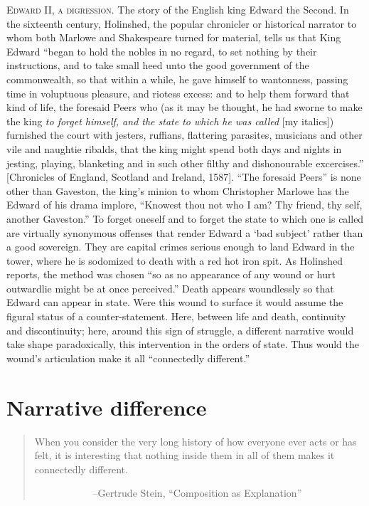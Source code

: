 \documentclass[
]{memoir}
\begin{document}
\textsc{Edward II, a digression.} The story of the English king Edward
the Second. In the sixteenth century, Holinshed, the popular chronicler
or historical narrator to whom both Marlowe and Shakespeare turned for
material, tells us that King Edward ``began to hold the nobles in no
regard, to set nothing by their instructions, and to take small heed
unto the good government of the commonwealth, so that within a while, he
gave himself to wantonness, passing time in voluptuous pleasure, and
riotess excess: and to help them forward that kind of life, the foresaid
Peers who (as it may be thought, he had sworne to make the king \emph{to
forget himself, and the state to which he was called} {[}my italics{]})
furnished the court with jesters, ruffians, flattering parasites,
musicians and other vile and naughtie ribalds, that the king might spend
both days and nights in jesting, playing, blanketing and in such other
filthy and dishonourable excercises.'' {[}Chronicles of England,
Scotland and Ireland, 1587{]}. ``The foresaid Peers'' is none other than
Gaveston, the king's minion to whom Christopher Marlowe has the Edward
of his drama implore, ``Knowest thou not who I am? Thy friend, thy self,
another Gaveston.'' To forget oneself and to forget the state to which
one is called are virtually synonymous offenses that render Edward a
`bad subject' rather than a good sovereign. They are capital crimes
serious enough to land Edward in the tower, where he is sodomized to
death with a red hot iron spit. As Holinshed reports, the method was
chosen ``so as no appearance of any wound or hurt outwardlie might be at
once perceived.'' Death appears woundlessly so that Edward can appear in
state. Were this wound to surface it would assume the figural status of
a counter-statement. Here, between life and death, continuity and
discontinuity; here, around this sign of struggle, a different narrative
would take shape paradoxically, this intervention in the orders of
state. Thus would the wound's articulation make it all ``connectedly
different.''

\hypertarget{narrative-difference}{%
\section*{Narrative difference}\label{narrative-difference}}

\begin{quote}
When you consider the very long history of how everyone ever acts or has
felt, it is interesting that nothing inside them in all of them makes it
connectedly different.

~~~~~~~~~~ ~--Gertrude Stein, ``Composition as Explanation''
\end{quote}
\end{document}
